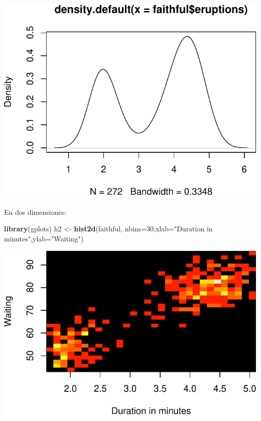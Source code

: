 \documentclass[]{article}
\newenvironment{Shaded}{\begin{snugshade}}{\end{snugshade}}
\newcommand{\KeywordTok}[1]{\textcolor[rgb]{0.13,0.29,0.53}{\textbf{{#1}}}}
\newcommand{\DataTypeTok}[1]{\textcolor[rgb]{0.13,0.29,0.53}{{#1}}}
\newcommand{\DecValTok}[1]{\textcolor[rgb]{0.00,0.00,0.81}{{#1}}}
\newcommand{\StringTok}[1]{\textcolor[rgb]{0.31,0.60,0.02}{{#1}}}
\newcommand{\NormalTok}[1]{{#1}}
\numberwithin{equation}{section}
\begin{document}
\includegraphics{tema1_files/figure-latex/unnamed-chunk-108-1.pdf}

En dos dimensiones:

\begin{Shaded}
\begin{Highlighting}[]
\KeywordTok{library}\NormalTok{(gplots)}
\NormalTok{h2 <-}\StringTok{ }\KeywordTok{hist2d}\NormalTok{(faithful, }\DataTypeTok{nbins=}\DecValTok{30}\NormalTok{,}\DataTypeTok{xlab=}\StringTok{"Duration in minutes"}\NormalTok{,}\DataTypeTok{ylab=}\StringTok{"Waiting"}\NormalTok{)}
\end{Highlighting}
\end{Shaded}

\includegraphics{tema1_files/figure-latex/unnamed-chunk-109-1.pdf}
\end{document}
